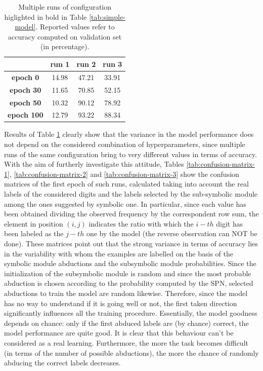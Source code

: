 \begin{table}[H]
  \caption{Multiple runs of configuration higlighted in bold in Table \ref{tab:simple-model}. Reported values refer to accuracy computed on validation set (in percentage).}
  \label{tab:multiple-run}
  \centering
  \renewcommand{\arraystretch}{0.8}
  \begin{tabular}{cccc}  
						& \textbf{run 1} & \textbf{run 2} & \textbf{run 3} \\
	\hline
	\textbf{epoch 0}	& 14.98 			& 47.21 		& 33.91  \\
	\hline
	\textbf{epoch 30}	& 11.65 			& 70.85 		& 52.15  \\
	\hline
	\textbf{epoch 50}	& 10.32 			& 90.12 		& 78.92  \\
	\hline
	\textbf{epoch 100} 	& 12.79				& 93.22 		& 88.34  \\
	\bottomrule
	\end{tabular}
\end{table}
Results of Table \ref{tab:multiple-run} clearly show that the variance in the model performance does not depend on the considered combination of hyperparameters, since multiple runs of the same configuration bring to very different values in terms of accuracy. With the aim of furtherly investigate this attitude, Tables \ref{tab:confusion-matrix-1}, \ref{tab:confusion-matrix-2} and \ref{tab:confusion-matrix-3} show the confusion matrices of the first epoch of such runs, calculated taking into account the real labels of the considered digits and the labels selected by the sub-symbolic module among the ones suggested by symbolic one. In particular, since each value has been obtained dividing the observed frequency by the correspondent row sum, the element in position $(i,j)$ indicates the ratio with which the $i-th$ digit has been labeled as the $j-th$ one by the model (the reverse observation can NOT be done). These matrices point out that the strong variance in terms of accuracy lies in the variability with whom the examples are labelled on the basis of the symbolic module abductions and the subsymbolic module probabilities. Since the initialization of the subsymbolic module is random and since the most probable abduction is chosen according to the probability computed by the SPN, selected abductions to train the model are random likewise. Therefore, since the model has no way to understand if it is going well or not, the first taken direction significantly influences all the training procedure. Essentially, the model goodness depends on chance: only if the first abduced labels are (by chance) correct, the model performance are quite good. It is clear that this behaviour can't be considered as a real learning. Furthermore, the more the task becomes difficult (in terms of the number of possible abductions), the more the chance of randomly abducing the correct labels decreases. 

